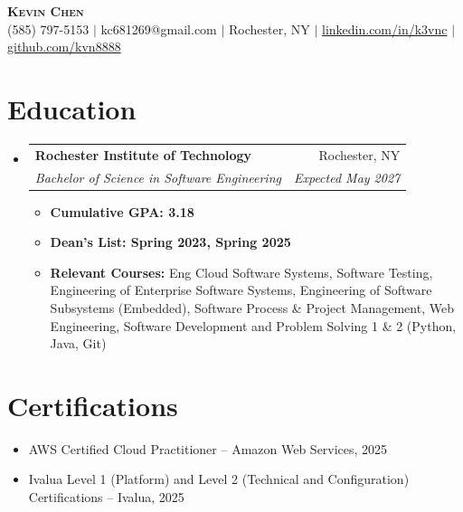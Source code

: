 \documentclass[letterpaper,11pt]{article}
\makeatletter
\newcommand{\resumeItem}[1]{
  \item\small{
    {#1 \vspace{-2pt}}
  }
}
\newcommand{\resumeSubheading}[4]{
  \vspace{-2pt}\item
    \begin{tabular*}{0.97\textwidth}[t]{l@{\extracolsep{\fill}}r}
      \textbf{#1} & #2 \\
      \textit{\small#3} & \textit{\small #4} \\
    \end{tabular*}\vspace{-7pt}
}
\newcommand{\resumeSubHeadingListStart}{\begin{itemize}[leftmargin=0.15in, label={}]}
\newcommand{\resumeSubHeadingListEnd}{\end{itemize}}
\newcommand{\resumeItemListStart}{\begin{itemize}}
\newcommand{\resumeItemListEnd}{\end{itemize}\vspace{-5pt}}
\makeatother
\begin{document}
\begin{center}
    \textbf{\Huge \scshape Kevin Chen} \\ \vspace{1pt}
    \small (585) 797-5153 $|$ kc681269@gmail.com $|$ Rochester, NY $|$ 
    \href{https://www.linkedin.com/in/k3vnc/}{linkedin.com/in/k3vnc} $|$ 
    \href{https://github.com/kvn8888}{github.com/kvn8888}
\end{center}

\section{Education}
  \resumeSubHeadingListStart
    \resumeSubheading
      {Rochester Institute of Technology}{Rochester, NY}
      {Bachelor of Science in Software Engineering}{Expected May 2027}
      \resumeItemListStart
        \resumeItem{\textbf{Cumulative GPA: 3.18}}
        \resumeItem{\textbf{Dean's List: Spring 2023, Spring 2025}}
        \resumeItem{\textbf{Relevant Courses:} Eng Cloud Software Systems, Software Testing, Engineering of Enterprise Software Systems, Engineering of Software Subsystems (Embedded), Software Process \& Project Management, Web Engineering, Software Development and Problem Solving 1 \& 2 (Python, Java, Git)}
      \resumeItemListEnd
  \resumeSubHeadingListEnd

\section{Certifications}
  \resumeSubHeadingListStart
    \resumeItem{AWS Certified Cloud Practitioner -- Amazon Web Services, 2025}
    \resumeItem{Ivalua Level 1 (Platform) and Level 2 (Technical and Configuration) Certifications -- Ivalua, 2025}
  \resumeSubHeadingListEnd

\end{document}
